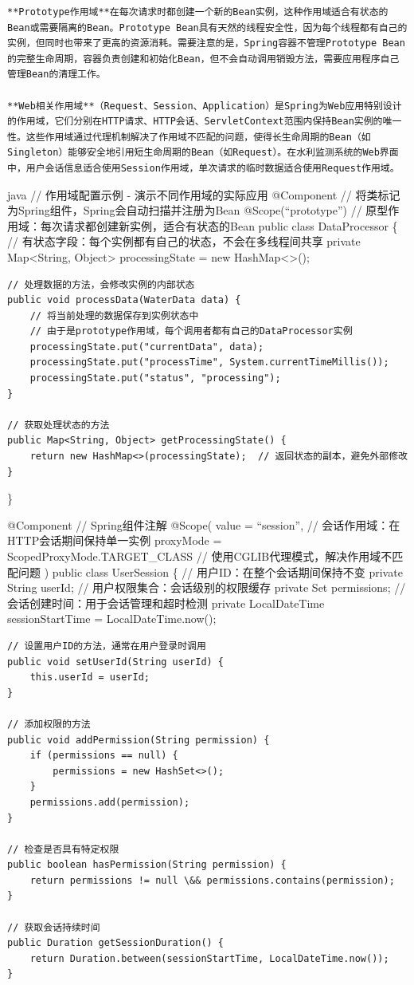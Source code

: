 \begin{lstlisting}
**Prototype作用域**在每次请求时都创建一个新的Bean实例，这种作用域适合有状态的Bean或需要隔离的Bean。Prototype Bean具有天然的线程安全性，因为每个线程都有自己的实例，但同时也带来了更高的资源消耗。需要注意的是，Spring容器不管理Prototype Bean的完整生命周期，容器负责创建和初始化Bean，但不会自动调用销毁方法，需要应用程序自己管理Bean的清理工作。

**Web相关作用域**（Request、Session、Application）是Spring为Web应用特别设计的作用域，它们分别在HTTP请求、HTTP会话、ServletContext范围内保持Bean实例的唯一性。这些作用域通过代理机制解决了作用域不匹配的问题，使得长生命周期的Bean（如Singleton）能够安全地引用短生命周期的Bean（如Request）。在水利监测系统的Web界面中，用户会话信息适合使用Session作用域，单次请求的临时数据适合使用Request作用域。
\end{lstlisting}

java // 作用域配置示例 - 演示不同作用域的实际应用 @Component // 将类标记为Spring组件，Spring会自动扫描并注册为Bean @Scope(``prototype'') // 原型作用域：每次请求都创建新实例，适合有状态的Bean public class DataProcessor \{ // 有状态字段：每个实例都有自己的状态，不会在多线程间共享 private Map\textless String, Object\textgreater{} processingState = new HashMap\textless\textgreater();

\begin{verbatim}
// 处理数据的方法，会修改实例的内部状态
public void processData(WaterData data) {
    // 将当前处理的数据保存到实例状态中
    // 由于是prototype作用域，每个调用者都有自己的DataProcessor实例
    processingState.put("currentData", data);
    processingState.put("processTime", System.currentTimeMillis());
    processingState.put("status", "processing");
}

// 获取处理状态的方法
public Map<String, Object> getProcessingState() {
    return new HashMap<>(processingState);  // 返回状态的副本，避免外部修改
}
\end{verbatim}

\}

@Component // Spring组件注解 @Scope( value = ``session'', // 会话作用域：在HTTP会话期间保持单一实例 proxyMode = ScopedProxyMode.TARGET\_CLASS // 使用CGLIB代理模式，解决作用域不匹配问题 ) public class UserSession \{ // 用户ID：在整个会话期间保持不变 private String userId; // 用户权限集合：会话级别的权限缓存 private Set permissions; // 会话创建时间：用于会话管理和超时检测 private LocalDateTime sessionStartTime = LocalDateTime.now();

\begin{verbatim}
// 设置用户ID的方法，通常在用户登录时调用
public void setUserId(String userId) {
    this.userId = userId;
}

// 添加权限的方法
public void addPermission(String permission) {
    if (permissions == null) {
        permissions = new HashSet<>();
    }
    permissions.add(permission);
}

// 检查是否具有特定权限
public boolean hasPermission(String permission) {
    return permissions != null \&& permissions.contains(permission);
}

// 获取会话持续时间
public Duration getSessionDuration() {
    return Duration.between(sessionStartTime, LocalDateTime.now());
}
\end{verbatim}

